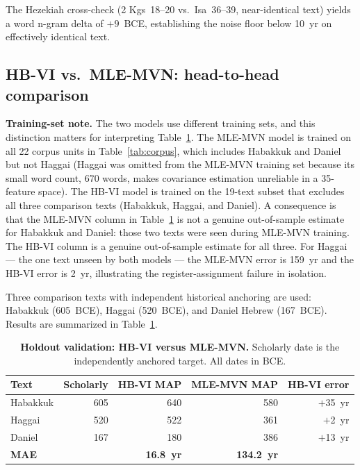 \documentclass[10pt,letterpaper]{article}
\newcommand{\mvn}{MLE-MVN}
\newcommand{\hbvi}{HB-VI}
\begin{document}
The Hezekiah cross-check (2 Kgs~18--20 vs.\ Isa~36--39, near-identical
text) yields a word n-gram delta of $+9$~BCE, establishing the noise
floor below 10~yr on effectively identical text.

\subsection*{HB-VI vs.\ MLE-MVN: head-to-head comparison}

\textbf{Training-set note.}  The two models use different training sets,
and this distinction matters for interpreting Table~\ref{tab:holdout}.
The \mvn{} model is trained on all 22 corpus units in
Table~\ref{tab:corpus}, which includes Habakkuk and Daniel but not
Haggai (Haggai was omitted from the \mvn{} training set because its
small word count, 670 words, makes covariance estimation unreliable in
a 35-feature space).  The \hbvi{} model is trained on the 19-text
subset that excludes all three comparison texts (Habakkuk, Haggai, and
Daniel).  A consequence is that the \mvn{} column in
Table~\ref{tab:holdout} is not a genuine out-of-sample estimate for
Habakkuk and Daniel: those two texts were seen during \mvn{} training.
The \hbvi{} column is a genuine out-of-sample estimate for all three.
For Haggai --- the one text unseen by both models --- the \mvn{}
error is 159~yr and the \hbvi{} error is 2~yr, illustrating the
register-assignment failure in isolation.

Three comparison texts with independent historical anchoring are used:
Habakkuk (605~BCE), Haggai (520~BCE), and Daniel Hebrew (167~BCE).
Results are summarized in Table~\ref{tab:holdout}.

\begin{table}[!ht]
\centering
\caption{\textbf{Holdout validation: \hbvi{} versus \mvn{}.}
Scholarly date is the independently anchored target.  All dates in BCE.}
\begin{tabular}{lrrrr}
\hline
\textbf{Text} & \textbf{Scholarly} &
  \textbf{HB-VI MAP} & \textbf{MLE-MVN MAP} & \textbf{HB-VI error} \\
\hline
Habakkuk & 605 & 640 & 580 & $+$35~yr \\
Haggai   & 520 & 522 & 361 & $+$2~yr  \\
Daniel   & 167 & 180 & 386 & $+$13~yr \\
\hline
\multicolumn{2}{l}{\textbf{MAE}} & \textbf{16.8~yr} & \textbf{134.2~yr} & \\
\hline
\end{tabular}
\label{tab:holdout}
\end{table}
\end{document}
